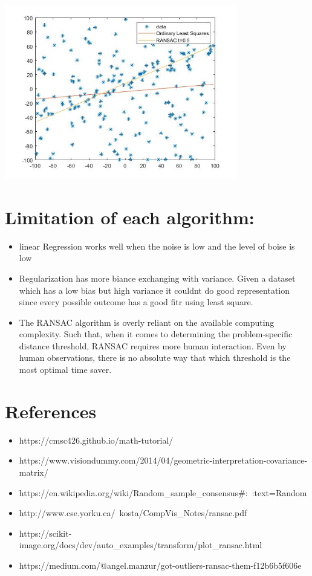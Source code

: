 \documentclass{article}
\begin{document}
\begin{itemize}
    \begin{figure6.jpg}
\centerline{\includegraphics[width=4in, height=3in]{figure6.jpg}}
\end{figure6.jpg}   

\end{itemize}




\section{Limitation of each algorithm:}
    \begin{itemize}
        \item linear Regression works well when the noise is low and the level of boise is low
        \item Regularization has more biance exchanging with variance. Given a dataset which has a low bias but high variance it couldnt do good representation since every possible outcome has a good fitr using least square.  
        \item The RANSAC algorithm is overly reliant on the available computing complexity. Such that, when it comes to determining the problem-specific distance threshold, RANSAC requires more human interaction. Even by human observations, there is no absolute way that which threshold is the most optimal time saver.
    \end{itemize}



\section{References}
\begin{itemize}
    \item https://cmsc426.github.io/math-tutorial/
    \item https://www.visiondummy.com/2014/04/geometric-interpretation-covariance-matrix/
    \item https://en.wikipedia.org/wiki/Random_sample_consensus#:~:text=Random
    \item http://www.cse.yorku.ca/~kosta/CompVis_Notes/ransac.pdf
    \item https://scikit-image.org/docs/dev/auto_examples/transform/plot_ransac.html
    \item https://medium.com/@angel.manzur/got-outliers-ransac-them-f12b6b5f606e
\end{itemize}
\end{document}
